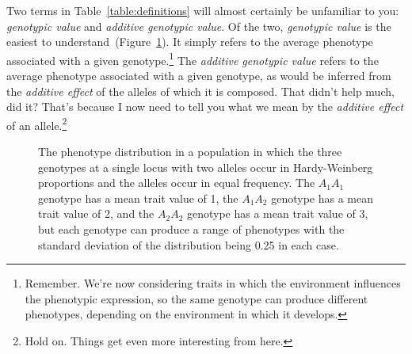 Two terms in Table~\ref{table:definitions} will almost certainly be
unfamiliar to you: {\it genotypic value\/} and {\it additive genotypic
  value}. Of the two, {\it genotypic value\/} is the easiest to
understand~(Figure~\ref{fig:genotypic-value}). It simply refers to the
average phenotype associated with a given
genotype.\footnote{Remember. We're now considering traits in which the
  environment influences the phenotypic expression, so the same
  genotype can produce different phenotypes, depending on the
  environment in which it develops.} The {\it additive genotypic
  value\/} refers to the average phenotype associated with a given
genotype, as would be inferred from the {\it additive effect\/} of the
alleles of which it is composed. That didn't help much, did it? That's
because I now need to tell you what we mean by the {\it additive
  effect\/} of an allele.\footnote{Hold on. Things get even more
  interesting from here.}

\begin{figure}
\begin{center}
\end{center}
\caption{The phenotype distribution in a population in which the three
  genotypes at a single locus with two alleles occur in Hardy-Weinberg
  proportions and the alleles occur in equal frequency. The $A_1A_1$
  genotype has a mean trait value of 1, the $A_1A_2$ genotype has a
  mean trait value of 2, and the $A_2A_2$ genotype has a mean trait
  value of 3, but each genotype can produce a range of phenotypes with
  the standard deviation of the distribution being 0.25 in each
  case.}\label{fig:genotypic-value}
\end{figure}

